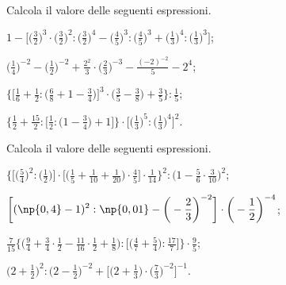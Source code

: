 \begin{esercizio}[\Ast]
Calcola il valore delle seguenti espressioni.
\begin{enumeratea}
\spazielenx
\item $\displaystyle{1-\bigg[\bigg(\frac{3}{2}\bigg)^{3}\cdot%
\bigg(\frac{3}{2}\bigg)^{2}:\bigg(\frac{3}{2}\bigg)^{4}-\bigg(\frac{4}{5}\bigg)^{3}:\bigg(\frac{4}{5}\bigg)^{3}+%
\bigg(\frac{1}{3}\bigg)^{4}:\bigg(\frac{1}{3}\bigg)^{3}\bigg]}$;
\item $\displaystyle{\bigg(\frac{1}{4}\bigg)^{-2}-\bigg(\frac{1}{2}\bigg)^{-2}+\frac{2^{2}}{3}\cdot%
\bigg(\frac{2}{3}\bigg)^{-3}-\frac{(-2)^{-2}}{5}-2^{4}}$;
\item $\displaystyle{\bigg\{\bigg[\frac{1}{6}+\frac{1}{2}:\bigg(\frac{6}{8}+1-\frac{3}{4}\bigg)\bigg]^{3}\cdot%
\bigg(\frac{3}{5}-\frac{3}{8}\bigg)+\frac{3}{5}\bigg\}:\frac{1}{5}}$;
\item $\displaystyle{\bigg\{\frac{1}{2}+\frac{15}{2}:\bigg[\frac{1}{2}:\bigg(1-\frac{3}{4}\bigg)+1\bigg]\bigg\}\cdot%
\bigg[\bigg(\frac{1}{3}\bigg)^{5}:\bigg(\frac{1}{3}\bigg)^{4}\bigg]^{2}}$.
\end{enumeratea}
\end{esercizio}

\begin{esercizio}[\Ast]
 Calcola il valore delle seguenti espressioni.
\begin{enumeratea}
\spazielenx
\item $\displaystyle{\bigg\{\bigg[\bigg(\frac{5}{4}\bigg)^{2}:\bigg(\frac{1}{2}\bigg)\bigg]\cdot%
\bigg[\bigg(\frac{1}{5}+\frac{1}{10}+\frac{1}{20}\bigg)\cdot\frac{4}{5}\bigg]\cdot%
\frac{1}{14}\bigg\}^{2}:\bigg(1-\frac{5}{6}\cdot\frac{3}{10}\bigg)^{2}}$;
\item $\displaystyle{\bigg[(\np{0,4}-1)^{2}:\np{0,01}-\bigg(-{\frac{2}{3}}\bigg)^{-2}\bigg]\cdot
\bigg(-{\frac{1}{2}}\bigg)^{-4}}$;
\item $\displaystyle{\frac{7}{15}\bigg\{\bigg(\frac{9}{4}+\frac{3}{4}\cdot
{\frac{1}{2}}-\frac{11}{16}\cdot\frac{1}{2}+\frac{1}{8}\bigg):\bigg[\bigg(\frac{4}{7}+\frac{5}{4}\bigg):\frac{17}{7}\bigg]\bigg\}\cdot
{\frac{9}{5}}}$;
\item $\displaystyle{\bigg(2+\frac{1}{2}\bigg)^{2}:\bigg(2-\frac{1}{2}\bigg)^{-2}+\bigg[\bigg(2+\frac{1}{3}\bigg)\cdot
\bigg(\frac{7}{3}\bigg)^{-2}\bigg]^{-1}}$.
\end{enumeratea}
\end{esercizio}

